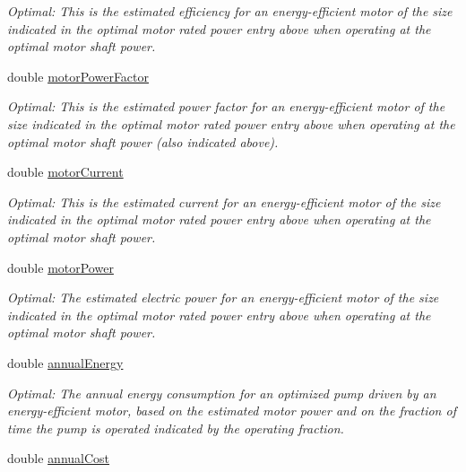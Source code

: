 \begin{DoxyCompactItemize}
\begin{DoxyCompactList}\small\item\em Optimal\+: This is the estimated efficiency for an energy-\/efficient motor of the size indicated in the optimal motor rated power entry above when operating at the optimal motor shaft power. \end{DoxyCompactList}\item 
double \hyperlink{struct_p_s_a_t_result_1_1_output_a4e99d794b66677cc0329f47a100d251a}{motor\+Power\+Factor}
\begin{DoxyCompactList}\small\item\em Optimal\+: This is the estimated power factor for an energy-\/efficient motor of the size indicated in the optimal motor rated power entry above when operating at the optimal motor shaft power (also indicated above). \end{DoxyCompactList}\item 
double \hyperlink{struct_p_s_a_t_result_1_1_output_a90611798efa48c24155f6c957683d3a8}{motor\+Current}
\begin{DoxyCompactList}\small\item\em Optimal\+: This is the estimated current for an energy-\/efficient motor of the size indicated in the optimal motor rated power entry above when operating at the optimal motor shaft power. \end{DoxyCompactList}\item 
double \hyperlink{struct_p_s_a_t_result_1_1_output_a531700e73ed9cc95d1dd4b2d58030ffb}{motor\+Power}
\begin{DoxyCompactList}\small\item\em Optimal\+: The estimated electric power for an energy-\/efficient motor of the size indicated in the optimal motor rated power entry above when operating at the optimal motor shaft power. \end{DoxyCompactList}\item 
double \hyperlink{struct_p_s_a_t_result_1_1_output_aa5c429ca2975c3222ed79e3847d1bf09}{annual\+Energy}
\begin{DoxyCompactList}\small\item\em Optimal\+: The annual energy consumption for an optimized pump driven by an energy-\/efficient motor, based on the estimated motor power and on the fraction of time the pump is operated indicated by the operating fraction. \end{DoxyCompactList}\item 
double \hyperlink{struct_p_s_a_t_result_1_1_output_a222e9c8df8c99f87abe372cad138d5f4}{annual\+Cost}

\end{DoxyCompactItemize}

